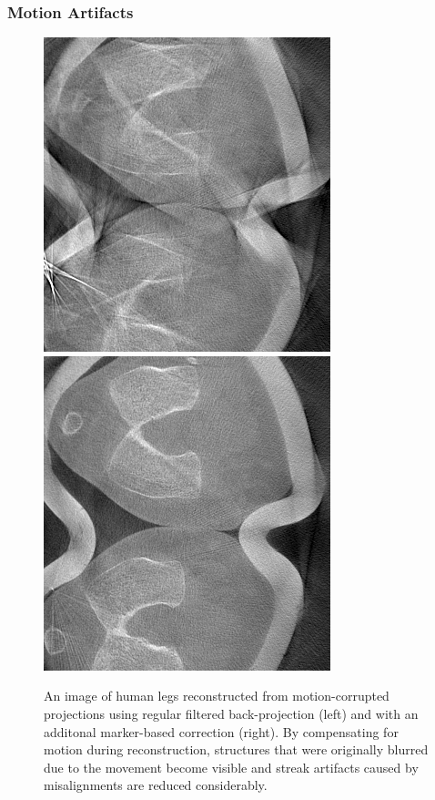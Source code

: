 \begin{frame}
	\frametitle{Motion Artifacts}

	\begin{figure}[tbp]
		\centering
		\includegraphics[height=0.7\textheight]{images/motion_1}
		\hspace{1cm}
		\includegraphics[height=0.7\textheight]{images/motion_2}
		\caption{An image of human legs reconstructed from motion-corrupted projections using regular filtered back-projection (left) and with an additonal marker-based correction (right). By compensating for motion during reconstruction, structures that were originally blurred due to the movement become visible and streak artifacts caused by misalignments are reduced considerably.}%
		\label{fig:ct_motion2}
	\end{figure}

\end{frame}

